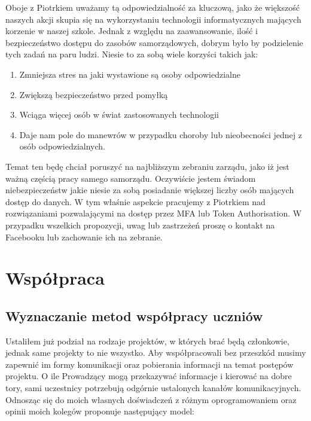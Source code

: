 \documentclass[9pt,a4paper]{report}
\begin{document}
Oboje z Piotrkiem uważamy tą odpowiedzialność za kluczową, jako że większość naszych akcji skupia się na wykorzystaniu technologii informatycznych mających korzenie w naszej szkole. Jednak z względu na zaawansowanie, ilość i bezpieczeństwo dostępu do zasobów samorządowych, dobrym było by podzielenie tych zadań na paru ludzi. Niesie to za sobą wiele korzyści takich jak:\\ 

\begin{enumerate} 

\item Zmniejsza stres na jaki wystawione są osoby odpowiedzialne 

\item Zwiększą bezpieczeństwo przed pomyłką 

\item Wciąga więcej osób w świat zastosowanych technologii 

\item Daje nam pole do manewrów w przypadku choroby lub nieobecności jednej z osób odpowiedzialnych. 

\end{enumerate} 

 

Temat ten będę chciał poruszyć na najbliższym zebraniu zarządu, jako iż jest ważną częścią pracy samego samorządu. Oczywiście jestem świadom niebezpieczeństw jakie niesie za sobą posiadanie większej liczby osób mających dostęp do danych. W tym właśnie aspekcie pracujemy z Piotrkiem nad rozwiązaniami pozwalającymi na dostęp przez MFA lub Token Authorisation. W przypadku wszelkich propozycji, uwag lub zastrzeżeń proszę o kontakt na Facebooku lub zachowanie ich na zebranie. 

 

\chapter{Współpraca} 

 

\section{Wyznaczanie metod współpracy uczniów} 

Ustaliłem już podział na rodzaje projektów, w których brać będą członkowie, jednak same projekty to nie wszystko. Aby współpracowali bez przeszkód musimy zapewnić im formy komunikacji oraz pobierania informacji na temat postępów projektu. O ile Prowadzący mogą przekazywać informacje i kierować na dobre tory, sami uczestnicy potrzebują odgórnie ustalonych kanałów komunikacyjnych. Odnosząc się do moich własnych doświadczeń z różnym oprogramowaniem oraz opinii moich kolegów proponuje następujący model:\\\\ 
\end{document}
